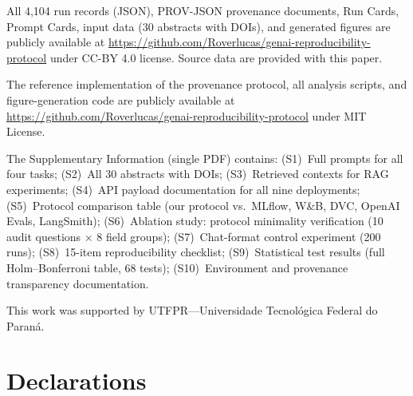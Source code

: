 \documentclass[sn-nature]{sn-jnl}
\begin{document}
\backmatter


All 4,104 run records (JSON), PROV-JSON provenance documents, Run Cards, Prompt Cards, input data (30 abstracts with DOIs), and generated figures are publicly available at \url{https://github.com/Roverlucas/genai-reproducibility-protocol} under CC-BY 4.0 license.
Source data are provided with this paper.


The reference implementation of the provenance protocol, all analysis scripts, and figure-generation code are publicly available at \url{https://github.com/Roverlucas/genai-reproducibility-protocol} under MIT License.


The Supplementary Information (single PDF) contains:
(S1)~Full prompts for all four tasks;
(S2)~All 30 abstracts with DOIs;
(S3)~Retrieved contexts for RAG experiments;
(S4)~API payload documentation for all nine deployments;
(S5)~Protocol comparison table (our protocol vs.\ MLflow, W\&B, DVC, OpenAI Evals, LangSmith);
(S6)~Ablation study: protocol minimality verification (10 audit questions $\times$ 8 field groups);
(S7)~Chat-format control experiment (200 runs);
(S8)~15-item reproducibility checklist;
(S9)~Statistical test results (full Holm--Bonferroni table, 68 tests);
(S10)~Environment and provenance transparency documentation.


This work was supported by UTFPR---Universidade Tecnol\'ogica Federal do Paran\'a.

\section*{Declarations}
\end{document}

